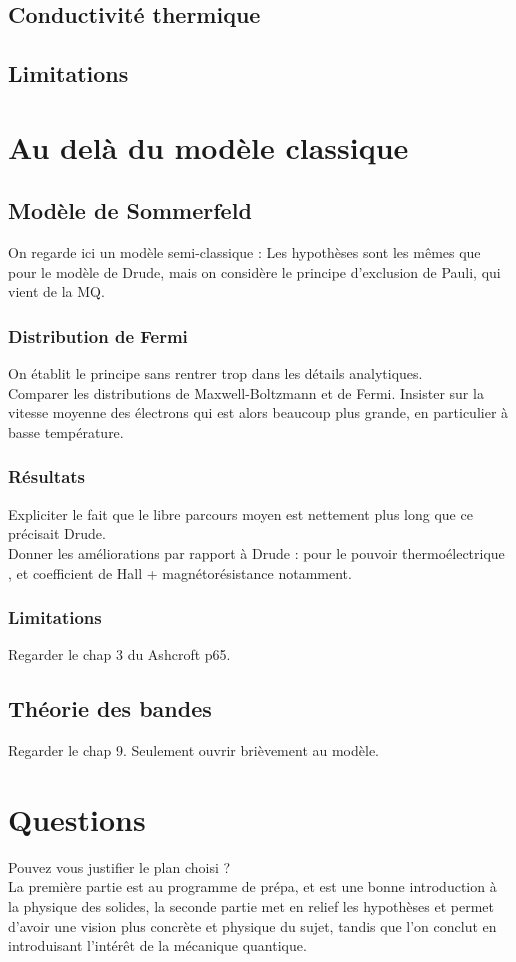 \documentclass[12pt,prb,aps,epsf]{article}
\begin{document}
\subsection{Conductivité thermique}
\subsection{Limitations}


\section{Au delà du modèle classique}
\subsection{Modèle de Sommerfeld}
On regarde ici un modèle semi-classique : Les hypothèses sont les mêmes que pour le modèle de Drude, mais on considère le principe d'exclusion de Pauli, qui vient de la MQ.
\subsubsection{Distribution de Fermi}
On établit le principe sans rentrer trop dans les détails analytiques. \\
Comparer les distributions de Maxwell-Boltzmann et de Fermi. Insister sur la vitesse moyenne des électrons qui est alors beaucoup plus grande, en particulier à basse température.
\subsubsection{Résultats}
Expliciter le fait que le libre parcours moyen est nettement plus long que ce précisait Drude.\\
Donner les améliorations par rapport à Drude : pour le pouvoir thermoélectrique , et coefficient de Hall + magnétorésistance notamment.\\

\subsubsection{Limitations}
Regarder le chap 3 du Ashcroft p65.
\subsection{Théorie des bandes}
Regarder le chap 9. Seulement ouvrir brièvement au modèle.

\section*{Questions}
Pouvez vous justifier le plan choisi ?\\
La première partie est au programme de prépa, et est une bonne introduction à la physique des solides, la seconde partie met en relief les hypothèses et permet d'avoir une vision plus concrète et physique du sujet, tandis que l'on conclut en introduisant l'intérêt de la mécanique quantique.\\
\end{document}

